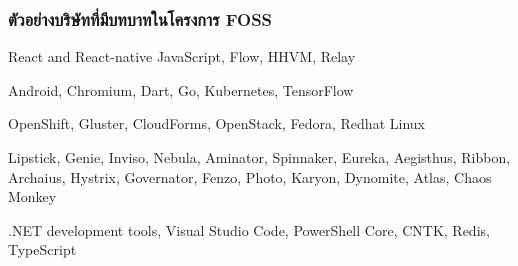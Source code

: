 \begin{frame}[t]
  \frametitle{ตัวอย่างบริษัทที่มีบทบาทในโครงการ FOSS}

  \begin{description}[<+->]
    \item[Facebook]  React and React-native JavaScript, Flow, HHVM, Relay
    \item[Google]  Android, Chromium, Dart, Go, Kubernetes, TensorFlow
    \item[Redhat]  OpenShift, Gluster, CloudForms, OpenStack, Fedora, Redhat Linux
    \item[Netflix]  Lipstick, Genie, Inviso, Nebula, Aminator, Spinnaker, Eureka, Aegisthus, Ribbon, Archaius, Hystrix, Governator, Fenzo, Photo, Karyon, Dynomite, Atlas, Chaos Monkey
    \item[Microsoft]  .NET development tools, Visual Studio Code, PowerShell Core, CNTK, Redis, TypeScript
  \end{description}

\end{frame}